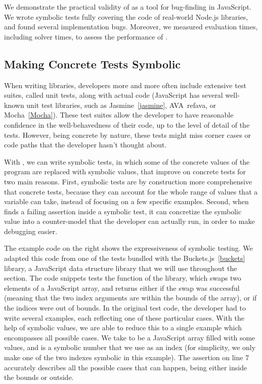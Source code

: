 
We demonstrate the practical validity of \cosette as a tool for bug-finding in JavaScript.
We wrote symbolic tests fully covering the code of real-world Node.js libraries, and found several  implementation bugs.
Moreover, we measured evaluation times, including solver times, to assess the performance of \cosette.

\subsection{Making Concrete Tests Symbolic}

When writing libraries, developers more and more often include extensive test suites, called unit tests, along with actual code (JavaScript has several well-known unit test libraries, such as Jasmine~\ref{jasmine}, AVA~ref{ava}, or Mocha~\ref{Mocha}).
These test suites allow the developer to have reasonable confidence in the well-behavedness of their code, up to the level of detail of the tests.
However, being concrete by nature, these tests might miss corner cases or code paths that the developer hasn't thought about.

With \cosette, we can write symbolic tests, in which some of the concrete values of the program are replaced with symbolic values, that improve on concrete tests for two main reasons.
First, symbolic tests are by construction more comprehensive that concrete tests, because they can account for the whole range of values that a variable can take, instead of focusing on a few specific examples.
Second, when \cosette finds a failing assertion inside a symbolic test, it can concretize the symbolic value into a counter-model that the developer can actually run, in order to make debugging easier.

The example code on the right shows the expressiveness of symbolic testing.
We adapted this code from one of the tests bundled with the Buckets.js~\ref{buckets} library, a JavaScript data structure library that we will use throughout the section.
The code snippets tests the  function of the library, which swaps two elements of a JavaScript array, and returns either  if the swap was successful (meaning that the two index arguments are within the bounds of the array), or  if the indices were out of bounds.
In the original test code, the developer had to write several examples, each reflecting one of these particular cases.
With the help of symbolic values, we are able to reduce this to a single example which encompasses all possible cases.
We take  to be a JavaScript array filled with some values, and  is a symbolic number that we use as an index (for simplicity, we only make one of the two indexes symbolic in this example).
The assertion on line 7 accurately describes all the possible cases that can happen,  being either inside the bounds or outside.

